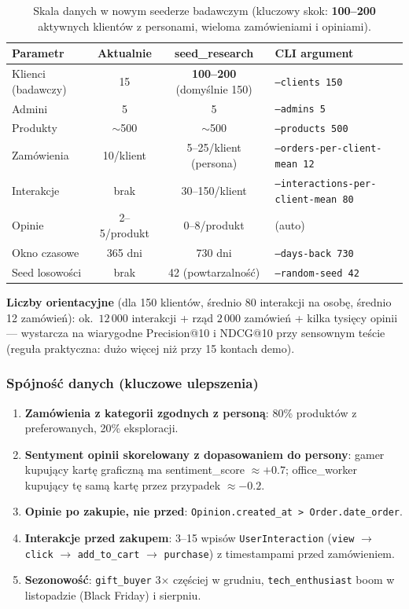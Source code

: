 \documentclass[a4paper,11pt]{article}
\newcommand{\code}[1]{\texttt{\small #1}}
\begin{document}
\begin{table}[H]
\centering
\small
\begin{tabularx}{\textwidth}{Y c c Y}
\toprule
\textbf{Parametr} & \textbf{Aktualnie} & \textbf{seed\_research} & \textbf{CLI argument} \\
\midrule
Klienci (badawczy) & 15 & \textbf{100--200} (domyślnie 150) & \code{--clients 150} \\
Admini & 5 & 5 & \code{--admins 5} \\
Produkty & $\sim$500 & $\sim$500 & \code{--products 500} \\
Zamówienia & 10/klient & 5--25/klient (persona) & \code{--orders-per-client-mean 12} \\
Interakcje & brak & 30--150/klient & \code{--interactions-per-client-mean 80} \\
Opinie & 2--5/produkt & 0--8/produkt & (auto) \\
Okno czasowe & 365 dni & 730 dni & \code{--days-back 730} \\
Seed losowości & brak & 42 (powtarzalność) & \code{--random-seed 42} \\
\bottomrule
\end{tabularx}
\caption{Skala danych w nowym seederze badawczym (kluczowy skok: \textbf{100--200} aktywnych klientów z personami, wieloma zamówieniami i opiniami).}
\end{table}

\textbf{Liczby orientacyjne} (dla 150 klientów, średnio 80 interakcji na osobę, średnio 12 zamówień): ok.\ $12\,000$ interakcji + rząd $2\,000$ zamówień + kilka tysięcy opinii --- wystarcza na wiarygodne Precision@10 i NDCG@10 przy sensownym teście (reguła praktyczna: dużo więcej niż przy 15 kontach demo).

\subsubsection{Spójność danych (kluczowe ulepszenia)}

\begin{enumerate}[leftmargin=1.5em,itemsep=2pt]
  \item \textbf{Zamówienia z kategorii zgodnych z personą}: 80\% produktów z preferowanych, 20\% eksploracji.
  \item \textbf{Sentyment opinii skorelowany z dopasowaniem do persony}: gamer kupujący kartę graficzną ma sentiment\_score $\approx +0.7$; office\_worker kupujący tę samą kartę przez przypadek $\approx -0.2$.
  \item \textbf{Opinie po zakupie, nie przed}: \code{Opinion.created\_at > Order.date\_order}.
  \item \textbf{Interakcje przed zakupem}: 3--15 wpisów \code{UserInteraction} (\code{view} $\to$ \code{click} $\to$ \code{add\_to\_cart} $\to$ \code{purchase}) z timestampami przed zamówieniem.
  \item \textbf{Sezonowość}: \code{gift\_buyer} 3$\times$ częściej w grudniu, \code{tech\_enthusiast} boom w listopadzie (Black Friday) i sierpniu.
\end{enumerate}
\end{document}
